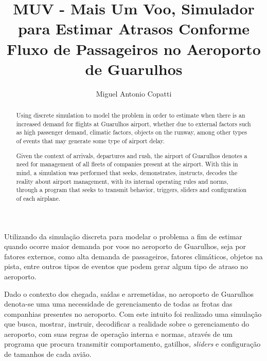 \documentclass[12pt]{article}
\title{MUV - Mais Um Voo, Simulador para Estimar Atrasos Conforme Fluxo de
    Passageiros no Aeroporto de Guarulhos}
\author{Miguel Antonio Copatti\inst{1}}
\begin{document}
 
  
  \maketitle
  
  \begin{abstract}
    Using discrete simulation to model the problem in order to estimate when there is
    an increased demand for flights at Guarulhos airport, whether due to external
    factors such as high passenger demand, climatic factors, objects on the runway,
    among other types of events that may generate some type of airport delay.
  
    Given the context of arrivals, departures and rush, the airport of Guarulhos denotes 
    a need for management of all fleets of companies present at the airport.
    With this in mind, a simulation was performed that seeks, demonstrates,
    instructs, decodes the reality about airport management, with its internal operating
    rules and norms, through a program that seeks to transmit behavior, triggers, sliders
    and configuration of each airplane.
    
  \end{abstract}
       
  \begin{resumo} 
  
  
  
    Utilizando da simulação discreta para modelar o problema a fim de estimar quando ocorre maior
    demanda por voos no aeroporto de Guarulhos, seja por fatores externos, como alta demanda de 
    passageiros, fatores climáticos, objetos na pista, entre outros tipos de eventos que podem 
    gerar algum tipo de atraso no aeroporto.
  
    Dado o contexto dos chegada, saídas e arremetidas, no aeroporto de Guarulhos denota-se uma
    uma necessidade de gerenciamento de todas as frotas das companhias presentes no aeroporto.
    Com este intuito foi realizado uma simulação que busca, mostrar, instruir, decodificar a
    realidade sobre o gerenciamento do aeroporto, com suas regras de operação interna e normas, 
    através de um programa que procura transmitir comportamento, gatilhos, \textit{sliders} e configuração
    de tamanhos de cada avião.
   
  
  \end{resumo}
  
\end{document}
